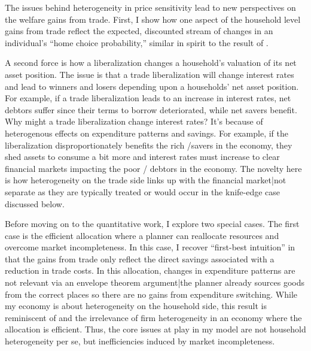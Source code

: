 \documentclass[12pt,pdftex]{article}
\begin{document}
\begin{onehalfspacing}
The issues behind heterogeneity in price sensitivity lead to new perspectives on the welfare gains from trade. First, I show how one aspect of the household level gains from trade reflect the expected, discounted stream of changes in an individual's ``home choice probability,''  similar in spirit to the result of \citet*{arkolakis2012new}.

A second force is how a liberalization changes a household's valuation of its net asset position. The issue is that a trade liberalization will change interest rates and lead to winners and losers depending upon a households' net asset position. For example, if a trade liberalization leads to an increase in interest rates, net debtors suffer since their terms to borrow deteriorated, while net savers benefit. Why might a trade liberalization change interest rates? It's because of heterogenous effects on expenditure patterns and savings. For example, if the liberalization disproportionately benefits the rich /savers in the economy, they shed assets to consume a bit more and interest rates must increase to clear financial markets impacting the poor / debtors in the economy. The novelty here is how heterogeneity on the trade side links up with the financial market|not separate as they are typically treated or would occur in the knife-edge case discussed below.



Before moving on to the quantitative work, I explore two special cases. The first case is the efficient allocation where a planner can reallocate resources and overcome market incompleteness. In this case, I recover ``first-best intuition'' in that the gains from trade only reflect the direct savings associated with a reduction in trade costs. In this allocation, changes in expenditure patterns are not relevant via an envelope theorem argument|the planner already sources goods from the correct places so there are no gains from expenditure switching. While my economy is about heterogeneity on the household side, this result is reminiscent of \citet{AtkesonBurstein2010} and the irrelevance of firm heterogeneity in an economy where the allocation is efficient. Thus, the core issues at play in my model are not household heterogeneity per se, but inefficiencies induced by market incompleteness.


\end{onehalfspacing}
\end{document}
